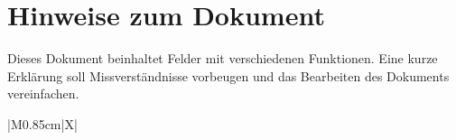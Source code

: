 \section*{Hinweise zum Dokument}

Dieses Dokument beinhaltet Felder mit verschiedenen Funktionen. Eine kurze Erklärung 
soll Missverständnisse vorbeugen und das Bearbeiten des Dokuments vereinfachen. 

\begin{table}[!ht]
    \renewcommand{\arraystretch}{1.3}
    \centering
    \begin{tabularx}{\textwidth}{|M{0.85cm}|X|}
        \hline
    \end{tabularx}
    \caption{Kategorien der Dokumentenhinweise}
\end{table}
